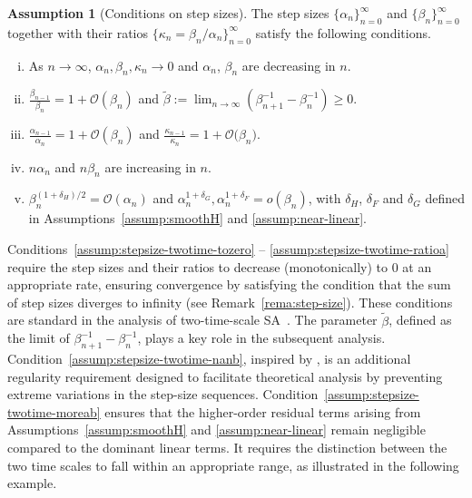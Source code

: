 \documentclass[11pt]{article}
\theoremstyle{plain}
\theoremstyle{definition}
\newtheorem{assump}{Assumption}[section]
\def\Hsmooth{{\delta_H}}
\def\Fsmooth{{\delta_F}}
\def\Gsmooth{{\delta_G}}
\def\invdifffast{\tilde{\alpha}}
\def\invdiffslow{\tilde{\beta}}
\def\OM{{\mathcal O}}
\begin{document}
\begin{assump}[Conditions on step sizes]\label{assump:stepsize-twotime} The step sizes $\{ \alpha_{n} \}_{n=0}^\infty$ and $\{ \beta_{n} \}_{n=0}^\infty$ together with their ratios $\{ \kappa_{n} = \beta_{n} / \alpha_{n} \}_{n=0}^\infty$ satisfy the following conditions.
	\begin{enumerate}[(i)]
		\item \label{assump:stepsize-twotime-tozero} As $n \to \infty$, $\alpha_{n}, \beta_{n}, \kappa_{n} \rightarrow 0$ and $\alpha_{n}$, $\beta_{n}$ are decreasing in $n$.
		\item \label{assump:stepsize-twotime-ratiob} $\frac{\beta_{n-1}}{\beta_{n}} = 1 + \OM(\beta_{n})$ and $\invdiffslow := \lim_{n \to \infty} (\beta_{n+1}^{-1} - \beta_{n}^{-1} ) \ge 0 $. 
		\item \label{assump:stepsize-twotime-ratioa} $\frac{\alpha_{n-1}}{\alpha_{n}} = 1 + \OM(\beta_{n})$ and $\frac{\kappa_{n-1}}{\kappa_{n}} = 1 + \OM\big(\beta_{n}\big)$.
		\item \label{assump:stepsize-twotime-nanb} $n \alpha_{n}$ and $n \beta_{n}$ are increasing in $n$.
		\item \label{assump:stepsize-twotime-moreab} $\beta_{n}^{(1+\Hsmooth) / 2 } = \OM(\alpha_{n})$ and $ \alpha_{n}^{1+\Gsmooth}, \alpha_{n}^{1+\Fsmooth} = o(\beta_{n}) $, with $\Hsmooth$, $\Fsmooth$ and $\Gsmooth$ defined in Assumptions~\ref{assump:smoothH} and \ref{assump:near-linear}.
		
	\end{enumerate}
\end{assump}

Conditions~\ref{assump:stepsize-twotime-tozero} -- \ref{assump:stepsize-twotime-ratioa}
require the step sizes and their ratios to decrease (monotonically) to $0$ at an appropriate rate, ensuring convergence by satisfying the condition that the sum of step sizes diverges to infinity (see Remark~\ref{rema:step-size}).
These conditions are standard in the analysis of two-time-scale SA~\citep{konda2004convergence, mokkadem2006convergence, faizal2023functional, kaledin2020finite}.
The parameter $\invdiffslow$, defined as the limit of $\beta_{n+1}^{-1} - \beta_{n}^{-1}$,  plays a key role in the subsequent analysis.
Condition~\ref{assump:stepsize-twotime-nanb}, inspired by \cite{li2023online}, is an additional regularity requirement designed to facilitate theoretical analysis by preventing extreme variations in the step-size sequences.
Condition~\ref{assump:stepsize-twotime-moreab} ensures that the higher-order residual terms arising from Assumptions~\ref{assump:smoothH} and \ref{assump:near-linear} remain negligible compared to the dominant linear terms. It requires the distinction between the two time scales to fall within an appropriate range, as illustrated in the following example.
\end{document}

